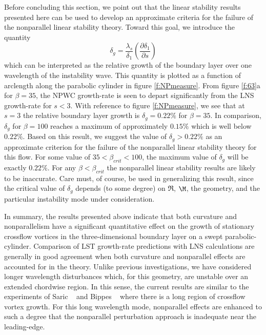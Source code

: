 Before concluding this section, we point out that the linear stability results
presented here can be used to develop an approximate criteria for the failure
of the nonparallel linear stability theory.  Toward this goal, we introduce
the quantity
%
\begin{equation}
  \delta_g = \frac{\lambda_s}{\delta_1} \left(\frac{\partial\delta_1} 
                                                   {\partial s}\right)
\end{equation}
%
which can be interpreted as the relative growth of the boundary layer over one
wavelength of the instability wave.  This quantity is plotted as a function of
arclength along the parabolic cylinder in figure \ref{f:NPmeasure}.  From
figure \ref{f:63}a for $\beta=35$, the NPWC growth-rate is seen to depart
significantly from the LNS growth-rate for $s < 3$.  With reference to figure
\ref{f:NPmeasure}, we see that at $s=3$ the relative boundary layer growth is
$\delta_g = 0.22 \%$ for $\beta=35$.  In comparison, $\delta_g$ for
$\beta=100$ reaches a maximum of approximately $0.15 \%$ which is well below
$0.22 \%$.  Based on this result, we suggest the value of $\delta_g > 0.22 \%$
as an approximate criterion for the failure of the nonparallel linear
stability theory for this flow.  For some value of $35 < \beta_{crit} < 100$,
the maximum value of $\delta_g$ will be exactly $0.22 \%$.  For any $\beta <
\beta_{crit}$ the nonparallel linear stability results are likely to be
inaccurate.  Care must, of course, be used in generalizing this result, since
the critical value of $\delta_g$ depends (to some degree) on $\Re$, $\M$, the
geometry, and the particular instability mode under consideration.

In summary, the results presented above indicate that both curvature and
nonparallelism have a significant quantitative effect on the growth of
stationary crossflow vortices in the three-dimensional boundary layer on a
swept parabolic-cylinder.  Comparison of LST growth-rate predictions with LNS
calculations are generally in good agreement when both curvature and
nonparallel effects are accounted for in the theory.  Unlike previous
investigations, we have considered longer wavelength disturbances which, for
this geometry, are unstable over an extended chordwise region.  In this sense,
the current results are similar to the experiments of Saric \etal\
\cite{ReSaCaCh:96} and Bippes \etal\ \cite{DeBi:96} where there is a long
region of crossflow vortex growth.  For this long wavelength mode, nonparallel
effects are enhanced to such a degree that the nonparallel perturbation
approach is inadequate near the leading-edge.

